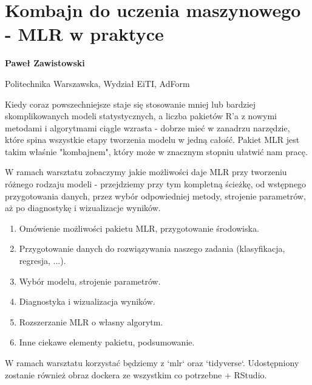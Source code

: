 \documentclass[\main/boa.tex]{subfiles}
\begin{document}
\section[Kombajn do uczenia maszynowego - MLR w praktyce]{Kombajn do uczenia maszynowego \\- MLR w praktyce}

\begin{minipage}{0.915\textwidth}
\centering
{\bf {} Paweł Zawistowski}
\end{minipage}

\vskip 0.3cm

\begin{affiliations}
\begin{minipage}{0.915\textwidth}
\centering
\large Politechnika Warszawska, Wydział EiTI, AdForm  \\[2pt]
\end{minipage}
\end{affiliations}

\vskip 0.8cm

\opiswarsztatu Kiedy coraz powszechniejsze staje się stosowanie mniej lub bardziej skomplikowanych modeli statystycznych, a liczba pakietów R'a z nowymi metodami i algorytmami ciągle wzrasta - dobrze mieć w zanadrzu narzędzie, które spina wszystkie etapy tworzenia modelu w jedną całość. Pakiet MLR jest takim właśnie "kombajnem", który może w znacznym stopniu ułatwić nam pracę. 

W ramach warsztatu zobaczymy jakie możliwości daje MLR przy tworzeniu różnego rodzaju modeli - przejdziemy przy tym kompletną ścieżkę, od wstępnego przygotowania danych, przez wybór odpowiedniej metody, strojenie parametrów, aż po diagnostykę i wizualizacje wyników.

\planwarsztatu
\begin{enumerate}
\item Omówienie możliwości pakietu MLR, przygotowanie środowiska.
\item Przygotowanie danych do rozwiązywania naszego zadania (klasyfikacja, regresja, ...).
\item Wybór modelu, strojenie parametrów.
\item Diagnostyka i wizualizacja wyników.
\item Rozszerzanie MLR o własny algorytm.
\item Inne ciekawe elementy pakietu, podsumowanie.
\end{enumerate}	 

\pakiety W ramach warsztatu korzystać będziemy z `mlr` oraz `tidyverse`. Udostępniony zostanie również obraz dockera ze wszystkim co potrzebne + RStudio.
\end{document}
